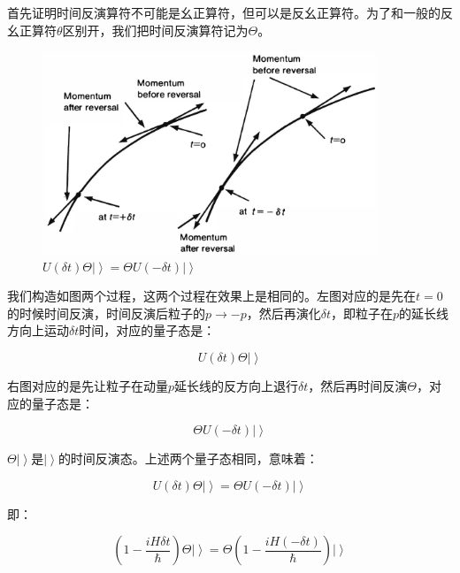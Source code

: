 首先证明时间反演算符不可能是幺正算符，但可以是反幺正算符。为了和一般的反幺正算符$\theta$区别开，我们把时间反演算符记为$\Theta$。

\begin{figure}[htbp]
\begin{center}
\includegraphics[width=10cm]{Symmetry/timereversal.png}
\caption{$ U(\delta t) \Theta \left| {} \right\rangle = \Theta  U(- \delta t) \left| {} \right\rangle $}
\end{center}
\end{figure}

我们构造如图两个过程，这两个过程在效果上是相同的。左图对应的是先在$t=0$的时候时间反演，时间反演后粒子的$p \to -p$，然后再演化$\delta t$，即粒子在$p$的延长线方向上运动$\delta t$时间，对应的量子态是：

\begin{equation}
U(\delta t) \Theta \left| {} \right\rangle
\end{equation}

右图对应的是先让粒子在动量$p$延长线的反方向上退行$\delta t$，然后再时间反演$\Theta$，对应的量子态是：

\begin{equation}
\Theta U(-\delta t) \left| {} \right\rangle  
\end{equation}

$\Theta \left| {} \right\rangle$是$\left| {} \right\rangle$的时间反演态。上述两个量子态相同，意味着：

\begin{equation}
U(\delta t) \Theta \left| {}  \right\rangle = \Theta U(-\delta t) \left| {} \right\rangle
\end{equation}

即：

\begin{equation}
\left( 1 -  \frac{i H \delta t}{\hbar}  \right) \Theta \left| {} \right\rangle = \Theta \left( 1 -  \frac{i H (- \delta t)}{\hbar}  \right) \left| {} \right\rangle
\end{equation}

